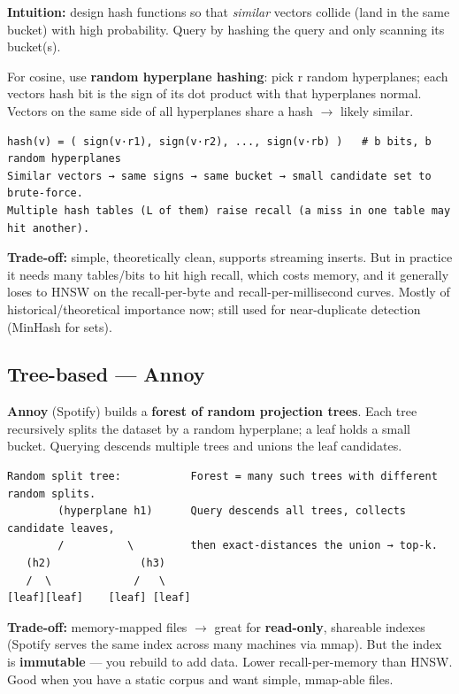 \documentclass[11pt]{article}
\begin{document}
\textbf{Intuition:} design hash functions so that \emph{similar} vectors collide (land in the same bucket) with high probability. Query by hashing the query and only scanning its bucket(s).

For cosine, use \textbf{random hyperplane hashing}: pick r random hyperplanes; each vector\textquotesingle s hash bit is the sign of its dot product with that hyperplane\textquotesingle s normal. Vectors on the same side of all hyperplanes share a hash \(\rightarrow\) likely similar.

\setcodelang{}

\begin{verbatim}
hash(v) = ( sign(v·r1), sign(v·r2), ..., sign(v·rb) )   # b bits, b random hyperplanes
Similar vectors → same signs → same bucket → small candidate set to brute-force.
Multiple hash tables (L of them) raise recall (a miss in one table may hit another).
\end{verbatim}

\textbf{Trade-off:} simple, theoretically clean, supports streaming inserts. But in practice it needs many tables/bits to hit high recall, which costs memory, and it generally loses to HNSW on the recall-per-byte and recall-per-millisecond curves. Mostly of historical/theoretical importance now; still used for near-duplicate detection (MinHash for sets).

\subsection{Tree-based --- Annoy}\label{tree-based--annoy}

\textbf{Annoy} (Spotify) builds a \textbf{forest of random projection trees}. Each tree recursively splits the dataset by a random hyperplane; a leaf holds a small bucket. Querying descends multiple trees and unions the leaf candidates.

\setcodelang{}

\begin{verbatim}
Random split tree:           Forest = many such trees with different random splits.
        (hyperplane h1)      Query descends all trees, collects candidate leaves,
        /          \         then exact-distances the union → top-k.
   (h2)              (h3)
   /  \             /   \
[leaf][leaf]    [leaf] [leaf]
\end{verbatim}

\textbf{Trade-off:} memory-mapped files \(\rightarrow\) great for \textbf{read-only}, shareable indexes (Spotify serves the same index across many machines via mmap). But the index is \textbf{immutable} --- you rebuild to add data. Lower recall-per-memory than HNSW. Good when you have a static corpus and want simple, mmap-able files.
\end{document}
